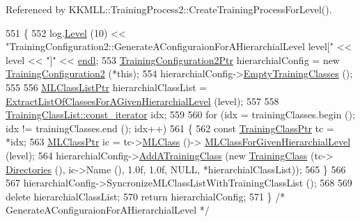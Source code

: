 Referenced by K\+K\+M\+L\+L\+::\+Training\+Process2\+::\+Create\+Training\+Process\+For\+Level().


\begin{DoxyCode}
551 \{
552   log.\hyperlink{class_k_k_b_1_1_run_log_a32cf761d7f2e747465fd80533fdbb659}{Level} (10) << \textcolor{stringliteral}{"TrainingConfiguration2::GenerateAConfiguraionForAHierarchialLevel  level["} << 
      level << \textcolor{stringliteral}{"]"} << \hyperlink{namespace_k_k_b_ad1f50f65af6adc8fa9e6f62d007818a8}{endl};
553   \hyperlink{class_k_k_m_l_l_1_1_training_configuration2}{TrainingConfiguration2Ptr}  hierarchialConfig = \textcolor{keyword}{new} 
      \hyperlink{class_k_k_m_l_l_1_1_training_configuration2_a30f123ba51f4a4c91f8824fff105ebf3}{TrainingConfiguration2} (*\textcolor{keyword}{this});
554   hierarchialConfig->\hyperlink{class_k_k_m_l_l_1_1_training_configuration2_aa90043c22d4bcbffc4a75a1d55bac942}{EmptyTrainingClasses} ();
555 
556   \hyperlink{class_k_k_m_l_l_1_1_m_l_class_list}{MLClassListPtr}  hierarchialClassList = 
      \hyperlink{class_k_k_m_l_l_1_1_training_configuration2_a603b0a9dfe8a6a6215b41c4de7e8faa4}{ExtractListOfClassesForAGivenHierarchialLevel} (level);
557 
558   \hyperlink{class_k_k_b_1_1_k_k_queue_aeb057c9c010446f46f57c1e355f981f1}{TrainingClassList::const\_iterator}  idx;
559   
560   \textcolor{keywordflow}{for}  (idx = trainingClasses.begin ();  idx != trainingClasses.end ();  idx++)
561   \{
562     \textcolor{keyword}{const} \hyperlink{class_k_k_m_l_l_1_1_training_class}{TrainingClassPtr} tc = *idx;
563     \hyperlink{class_k_k_m_l_l_1_1_m_l_class}{MLClassPtr}  ic = tc->\hyperlink{class_k_k_m_l_l_1_1_training_class_a2f28d3ab6694f610fceeacd94ffee4ad}{MLClass} ()->
      \hyperlink{class_k_k_m_l_l_1_1_m_l_class_a739ec0353640c9a40e3a5aea30f8915d}{MLClassForGivenHierarchialLevel} (level);
564     hierarchialConfig->\hyperlink{class_k_k_m_l_l_1_1_training_configuration2_a2479c75fd5deb8d82b05028a1b158a75}{AddATrainingClass} (\textcolor{keyword}{new} \hyperlink{class_k_k_m_l_l_1_1_training_class}{TrainingClass} (tc->
      \hyperlink{class_k_k_m_l_l_1_1_training_class_afe6db8b575f7e26b16ffa24a72cd3f84}{Directories} (), ic->Name (), 1.0f, 1.0f, NULL, *hierarchialClassList));
565   \}
566 
567   hierarchialConfig->SyncronizeMLClassListWithTrainingClassList ();
568 
569   \textcolor{keyword}{delete}  hierarchialClassList;
570   \textcolor{keywordflow}{return}  hierarchialConfig;
571 \} \textcolor{comment}{/* GenerateAConfiguraionForAHierarchialLevel */}
\end{DoxyCode}
